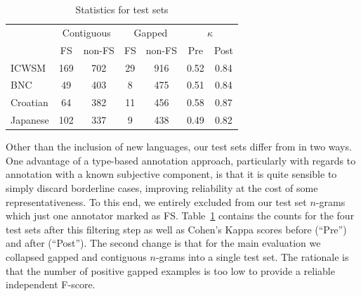 \documentclass[11pt,letterpaper]{article}
\newcommand{\z}{\phantom{0}}
\newcommand{\tabref}[2][]{Table#1~\ref{#2}\xspace}
\newcommand{\secref}[2][]{Section#1~\ref{#2}\xspace}
\begin{document}
\begin{table}[!bt]
 
 \begin{center}
	 \begin{tabular}{@{}lc@{\,\,\,}cc@{\,\,\,}cc@{\,\,\,}c@{}}

       \toprule
       & \multicolumn{2}{c}{Contiguous} & \multicolumn{2}{c}{Gapped} & \multicolumn{2}{c}{$\kappa$} \\ %
       \cmidrule(lr){2-3}\cmidrule(lr){4-5}\cmidrule(lr){6-7}
			& FS & non-FS & FS & non-FS & Pre & Post \\
			 \midrule
			ICWSM    & 169  & 702 & 29 & 916 &0.52 &0.84 \\
			BNC      & \z49 & 403 & \z8& 475 &0.51 &0.84 \\
			Croatian & \z64 & 382 & 11 & 456 & 0.58 &0.87 \\
			Japanese & 102  & 337 & \z9 & 438 & 0.49 &0.82\\
       \bottomrule
 \end{tabular}
  \caption{ Statistics for test sets }
	 \label{tab:stats}

 \end{center}

 \end{table}

Other than the inclusion of new languages, our test sets differ from  in two ways. One advantage of a type-based annotation approach, particularly with regards to annotation with a known subjective component, is that it is quite sensible to simply discard borderline cases, improving reliability at the cost of some representativeness. To this end, we entirely excluded from our test set $n$-grams which just one annotator marked as FS. \tabref{tab:stats} contains the counts for the four test sets after this filtering step as well as Cohen's Kappa scores before (``Pre'') and after (``Post'').  The second change is that for the main evaluation we collapsed gapped and contiguous $n$-grams into a single test set. The rationale is that the number of positive gapped examples is too low to provide a reliable independent F-score.

\end{document}

